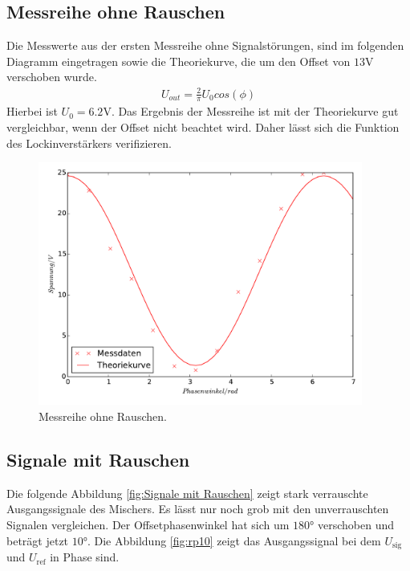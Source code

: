 \subsection{Messreihe ohne Rauschen}
\label{sec:Messreihe ohne Rauschen}
Die Messwerte aus der ersten Messreihe ohne Signalstörungen, sind im folgenden
Diagramm eingetragen sowie die Theoriekurve, die um den Offset von $13\si{\volt}$
verschoben wurde.
\begin{align*}
U_{out}=\frac{2}{\pi}U_0cos(\phi)
\end{align*}
 Hierbei ist $U_0=6.2\si{\volt}$. Das Ergebnis der Messreihe ist
mit der Theoriekurve gut vergleichbar, wenn der Offset nicht beachtet wird.
Daher lässt sich die Funktion des Lockinverstärkers verifizieren.
\begin{figure}
  \centering
  \includegraphics[height=8cm]{or_signal.pdf}
  \caption{Messreihe ohne Rauschen.}
  \label{fig:Mor}
\end{figure}

\subsection{Signale mit Rauschen}
\label{sec:Signale mit Rauschen}
Die folgende Abbildung \ref{fig:Signale mit Rauschen} zeigt stark verrauschte
Ausgangssignale des Mischers. Es lässt nur noch grob mit den unverrauschten
Signalen vergleichen. Der Offsetphasenwinkel hat sich um $180°$ verschoben und beträgt jetzt $10°$.
Die Abbildung \ref{fig:rp10} zeigt das Ausgangssignal bei dem $U_\text{sig}$ und
$U_\text{ref}$ in Phase sind.

